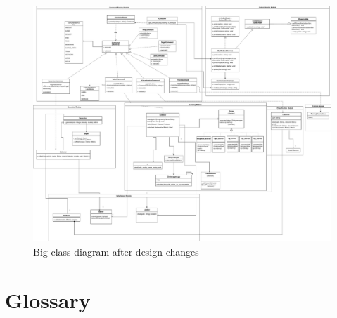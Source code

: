 \documentclass[parskip=full]{scrartcl}
\begin{document}
\newpage

\begin{figure}
    \includegraphics[width=\textwidth, height= \textheight, keepaspectratio]{../Big_classdiagram/Big_classdiagram.pdf}
    \caption{Big class diagram after design changes}
    \label{fig:PropProf}
\end{figure}


\newpage
\section{Glossary}

%
\printnoidxglossaries
\end{document}
